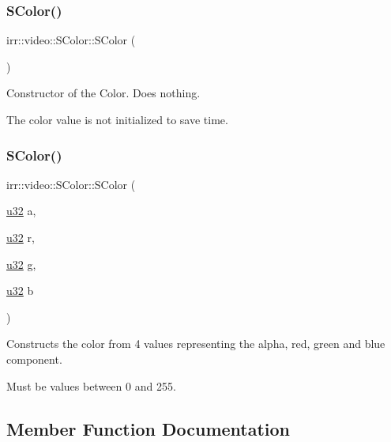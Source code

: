 \subsubsection{\texorpdfstring{S\+Color()}{SColor()}\hspace{0.1cm}{\footnotesize\ttfamily [3/4]}}
{\footnotesize\ttfamily irr\+::video\+::\+S\+Color\+::\+S\+Color (\begin{DoxyParamCaption}{ }\end{DoxyParamCaption})\hspace{0.3cm}{\ttfamily [inline]}}



Constructor of the Color. Does nothing. 

The color value is not initialized to save time. \mbox{\label{classirr_1_1video_1_1SColor_aa2ca1fcb9b11375282bb407b635b3dd6}} 
\subsubsection{\texorpdfstring{S\+Color()}{SColor()}\hspace{0.1cm}{\footnotesize\ttfamily [4/4]}}
{\footnotesize\ttfamily irr\+::video\+::\+S\+Color\+::\+S\+Color (\begin{DoxyParamCaption}\item[{\hyperlink{namespaceirr_a0416a53257075833e7002efd0a18e804}{u32}}]{a,  }\item[{\hyperlink{namespaceirr_a0416a53257075833e7002efd0a18e804}{u32}}]{r,  }\item[{\hyperlink{namespaceirr_a0416a53257075833e7002efd0a18e804}{u32}}]{g,  }\item[{\hyperlink{namespaceirr_a0416a53257075833e7002efd0a18e804}{u32}}]{b }\end{DoxyParamCaption})\hspace{0.3cm}{\ttfamily [inline]}}



Constructs the color from 4 values representing the alpha, red, green and blue component. 

Must be values between 0 and 255. 

\subsection{Member Function Documentation}
\mbox{\label{classirr_1_1video_1_1SColor_a8b0bcff9036b06e3483978a84a924b91}} 

